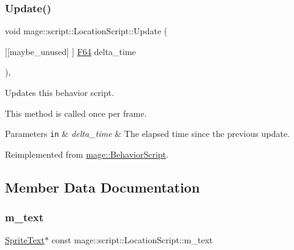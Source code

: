 \hypertarget{classmage_1_1script_1_1_location_script_a039dc17396f2914e1ca043d8384b62da}{}\label{classmage_1_1script_1_1_location_script_a039dc17396f2914e1ca043d8384b62da} 
\subsubsection{\texorpdfstring{Update()}{Update()}}
{\footnotesize\ttfamily void mage\+::script\+::\+Location\+Script\+::\+Update (\begin{DoxyParamCaption}\item[{\mbox{[}\mbox{[}maybe\+\_\+unused\mbox{]} \mbox{]} \hyperlink{namespacemage_ad26233bbec640deda836e572c1a23708}{F64}}]{delta\+\_\+time }\end{DoxyParamCaption})\hspace{0.3cm}{\ttfamily [override]}, {\ttfamily [virtual]}}

Updates this behavior script.

This method is called once per frame.


\begin{DoxyParams}[1]{Parameters}
\mbox{\tt in}  & {\em delta\+\_\+time} & The elapsed time since the previous update. \\
\hline
\end{DoxyParams}


Reimplemented from \hyperlink{classmage_1_1_behavior_script_afb9cf3759edf8876416d1df85489cba6}{mage\+::\+Behavior\+Script}.



\subsection{Member Data Documentation}
\hypertarget{classmage_1_1script_1_1_location_script_ab03912d70a8bcb3a682edc9081808e7a}{}\label{classmage_1_1script_1_1_location_script_ab03912d70a8bcb3a682edc9081808e7a} 
\subsubsection{\texorpdfstring{m\+\_\+text}{m\_text}}
{\footnotesize\ttfamily \hyperlink{classmage_1_1_sprite_text}{Sprite\+Text}$\ast$ const mage\+::script\+::\+Location\+Script\+::m\+\_\+text\hspace{0.3cm}{\ttfamily [private]}}

